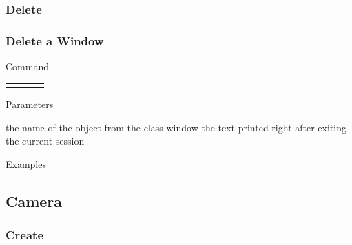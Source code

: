 \documentclass[9pt]{beamer}
\begin{document}
\subsubsection{Delete}

\begin{frame}[t] \frametitle{Delete a Window}

	\begin{block}{Command} 
		\begin{tabularx}{\textwidth}{@{}l@{}l@{}l@{}R}
			 &
				 &
			  	 & \InstrItem
		\end{tabularx}
	\end{block}

	\begin{block}{Parameters} \begin{itemize}
		   the name of the object from the class window
		    the text printed right after exiting the current session
	\end{itemize} \end{block}

	\begin{block}{Examples}
	\end{block}

\end{frame}

\subsection{Camera}

\subsubsection{Create}
\end{document}

